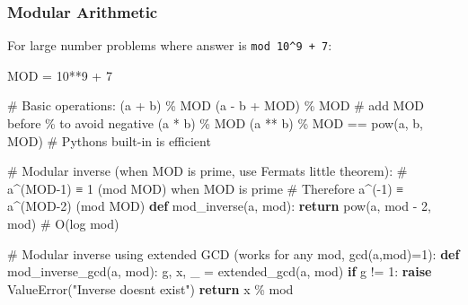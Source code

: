 \documentclass[11pt]{article}
\newenvironment{Shaded}{\begin{snugshade}}{\end{snugshade}}
\newcommand{\BuiltInTok}[1]{\textcolor[rgb]{0.50,0.55,0.55}{#1}}
\newcommand{\CommentTok}[1]{\textcolor[rgb]{0.48,0.49,0.49}{#1}}
\newcommand{\ControlFlowTok}[1]{\textcolor[rgb]{0.99,0.74,0.29}{\textbf{#1}}}
\newcommand{\DecValTok}[1]{\textcolor[rgb]{0.96,0.45,0.00}{#1}}
\newcommand{\KeywordTok}[1]{\textcolor[rgb]{0.81,0.81,0.76}{\textbf{#1}}}
\newcommand{\NormalTok}[1]{\textcolor[rgb]{0.81,0.81,0.76}{#1}}
\newcommand{\OperatorTok}[1]{\textcolor[rgb]{0.81,0.81,0.76}{#1}}
\newcommand{\PreprocessorTok}[1]{\textcolor[rgb]{0.15,0.68,0.38}{#1}}
\newcommand{\StringTok}[1]{\textcolor[rgb]{0.96,0.31,0.31}{#1}}
\begin{document}
\subsubsection{Modular Arithmetic}\label{modular-arithmetic}

For large number problems where answer is \texttt{mod\ 10\^{}9\ +\ 7}:


\begin{Shaded}
\begin{Highlighting}[]
\NormalTok{MOD }\OperatorTok{=} \DecValTok{10}\OperatorTok{**}\DecValTok{9} \OperatorTok{+} \DecValTok{7}

\CommentTok{\# Basic operations:}
\NormalTok{(a }\OperatorTok{+}\NormalTok{ b) }\OperatorTok{\%}\NormalTok{ MOD}
\NormalTok{(a }\OperatorTok{{-}}\NormalTok{ b }\OperatorTok{+}\NormalTok{ MOD) }\OperatorTok{\%}\NormalTok{ MOD   }\CommentTok{\# add MOD before \% to avoid negative}
\NormalTok{(a }\OperatorTok{*}\NormalTok{ b) }\OperatorTok{\%}\NormalTok{ MOD}
\NormalTok{(a }\OperatorTok{**}\NormalTok{ b) }\OperatorTok{\%}\NormalTok{ MOD }\OperatorTok{==} \BuiltInTok{pow}\NormalTok{(a, b, MOD)   }\CommentTok{\# Python\textquotesingle{}s built{-}in is efficient}

\CommentTok{\# Modular inverse (when MOD is prime, use Fermat\textquotesingle{}s little theorem):}
\CommentTok{\# a\^{}(MOD{-}1) ≡ 1 (mod MOD) when MOD is prime}
\CommentTok{\# Therefore a\^{}({-}1) ≡ a\^{}(MOD{-}2) (mod MOD)}
\KeywordTok{def}\NormalTok{ mod\_inverse(a, mod):}
    \ControlFlowTok{return} \BuiltInTok{pow}\NormalTok{(a, mod }\OperatorTok{{-}} \DecValTok{2}\NormalTok{, mod)   }\CommentTok{\# O(log mod)}

\CommentTok{\# Modular inverse using extended GCD (works for any mod, gcd(a,mod)=1):}
\KeywordTok{def}\NormalTok{ mod\_inverse\_gcd(a, mod):}
\NormalTok{    g, x, \_ }\OperatorTok{=}\NormalTok{ extended\_gcd(a, mod)}
    \ControlFlowTok{if}\NormalTok{ g }\OperatorTok{!=} \DecValTok{1}\NormalTok{: }\ControlFlowTok{raise} \PreprocessorTok{ValueError}\NormalTok{(}\StringTok{"Inverse doesn\textquotesingle{}t exist"}\NormalTok{)}
    \ControlFlowTok{return}\NormalTok{ x }\OperatorTok{\%}\NormalTok{ mod}


\end{Highlighting}
\end{Shaded}
\end{document}
